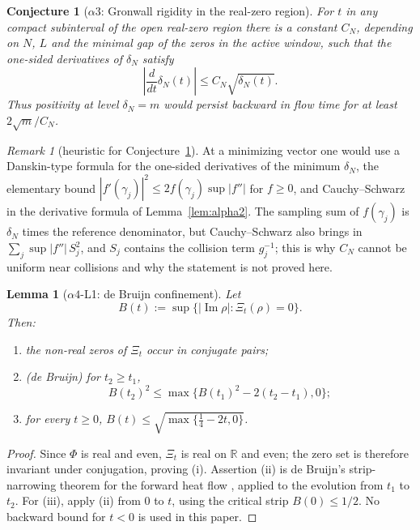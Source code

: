 \documentclass[11pt]{amsart}
\newtheorem{lemma}[theorem]{Lemma}
\newtheorem{conjecture}[theorem]{Conjecture}
\theoremstyle{definition}
\theoremstyle{remark}
\newtheorem{remark}[theorem]{Remark}
\theoremstyle{definition}
\renewcommand{\Im}{\operatorname{Im}}
\newcommand{\R}{\mathbb{R}}
\begin{document}
\begin{conjecture}[$\alpha3$: Gronwall rigidity in the real-zero region]\label{thm:alpha3}
For $t$ in any compact subinterval of the open real-zero region there is a constant $C_N$, depending on
$N$, $L$ and the minimal gap of the zeros in the active window, such that the one-sided derivatives of
$\delta_N$ satisfy
\[
   \left|\frac{d}{dt}\delta_N(t)\right|\le C_N\sqrt{\delta_N(t)}.
\]
Thus positivity at level $\delta_N=m$ would persist backward in flow time for at least
$2\sqrt m/C_N$.
\end{conjecture}

\begin{remark}[heuristic for Conjecture~\ref{thm:alpha3}]
At a minimizing vector one would use a Danskin-type formula for the one-sided derivatives of the
minimum $\delta_N$, the elementary bound $|f'(\gamma_j)|^2\le2f(\gamma_j)\sup|f''|$ for $f\ge0$, and
Cauchy--Schwarz in the derivative formula of Lemma~\ref{lem:alpha2}.  The sampling sum of $f(\gamma_j)$
is $\delta_N$ times the reference denominator, but Cauchy--Schwarz also brings in
$\sum_j\sup|f''|\,S_j^2$, and $S_j$ contains the collision term $g_j^{-1}$; this is why $C_N$ cannot be
uniform near collisions and why the statement is not proved here.
\end{remark}

\begin{lemma}[$\alpha4$-L1: de Bruijn confinement]\label{lem:alpha-L1}\label{lem:alpha-L1-full}
Let
\[
   B(t):=\sup\{|\Im\rho|:\Xi_t(\rho)=0\}.
\]
Then:
\begin{enumerate}[label=\textnormal{(\roman*)}]
\item the non-real zeros of $\Xi_t$ occur in conjugate pairs;
\item \textnormal{(de Bruijn)} for $t_2\ge t_1$,
\[
   B(t_2)^2\le \max\{B(t_1)^2-2(t_2-t_1),0\};
\]
\item for every $t\ge0$, $B(t)\le\sqrt{\max\{\tfrac14-2t,0\}}$.
\end{enumerate}
\end{lemma}

\begin{proof}
Since $\Phi$ is real and even, $\Xi_t$ is real on $\R$ and even; the zero set is therefore invariant
under conjugation, proving (i).  Assertion (ii) is de Bruijn's strip-narrowing theorem for the forward
heat flow \cite[Thm.~13]{deBruijn}, applied to the evolution from $t_1$ to $t_2$.  For (iii), apply (ii) from $0$ to $t$, using the
critical strip $B(0)\le1/2$.  No backward bound for $t<0$ is used in this paper.
\end{proof}
\end{document}

